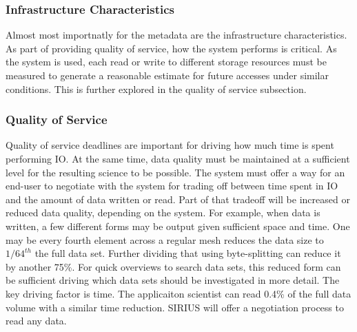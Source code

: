 \subsubsection{Infrastructure Characteristics}

Almost most importnatly for the metadata are the infrastructure
characteristics. As part of providing quality of service, how the system
performs is critical.  As the system is used, each read or write to different
storage resources must be measured to generate a reasonable estimate for future
accesses under similar conditions. This is further explored in the quality of
service subsection.

\subsubsection{Quality of Service}

Quality of service deadlines are important for driving how much time is spent
performing IO. At the same time, data quality must be maintained at a
sufficient level for the resulting science to be possible.  The system must
offer a way for an end-user to negotiate with the system for trading off
between time spent in IO and the amount of data written or read.  Part of that
tradeoff will be increased or reduced data quality, depending on the system.
For example, when data is written, a few different forms may be output given
sufficient space and time. One may be every fourth element across a regular
mesh reduces the data size to $1/64^{th}$ the full data set.  Further dividing
that using byte-splitting can reduce it by another 75\%. For quick overviews to
search data sets, this reduced form can be sufficient driving which data sets
should be investigated in more detail. The key driving factor is time. The
applicaiton scientist can read 0.4\% of the full data volume with a similar
time reduction. SIRIUS will offer a negotiation process to read any data.

